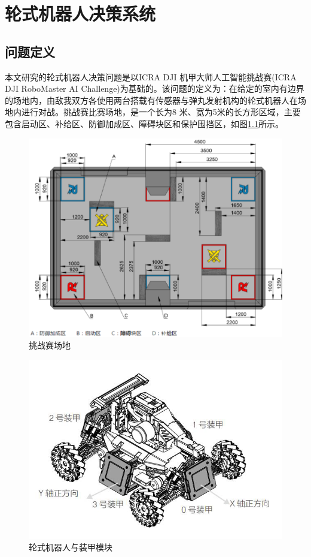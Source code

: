 \chapter{轮式机器人决策系统}\label{introduction}
\section{问题定义}
本文研究的轮式机器人决策问题是以ICRA DJI 机甲大师人工智能挑战赛(ICRA DJI RoboMaster AI Challenge)为基础的。该问题的定义为：在给定的室内有边界的场地内，由敌我双方各使用两台搭载有传感器与弹丸发射机构的轮式机器人在场地内进行对战。挑战赛比赛场地，是一个长为8 米、宽为5米的长方形区域，主要包含启动区、补给区、防御加成区、障碍块区和保护围挡区，如图\ref{field}所示。

\begin{figure}[htb]
  \centering
  \includegraphics[width=\textwidth]{figures/field.png}
  \caption{挑战赛场地}\label{field}
\end{figure}

\begin{figure}[htb]
  \centering
  \includegraphics[width=\textwidth]{figures/robot.png}
  \caption{轮式机器人与装甲模块}\label{robot}
\end{figure}


